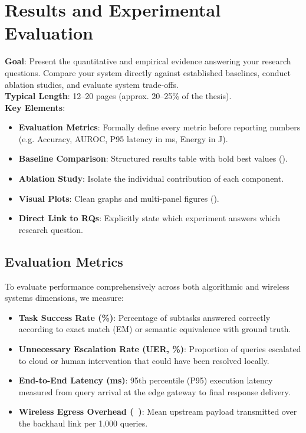 
\chapter{Results and Experimental Evaluation}
\label{ch:evaluation}

\begin{takeawaybox}
\textbf{Goal}: Present the quantitative and empirical evidence answering your research questions. Compare your system directly against established baselines, conduct ablation studies, and evaluate system trade-offs.\\
\textbf{Typical Length}: 12--20 pages (approx. 20--25\% of the thesis).\\
\textbf{Key Elements}:
\begin{itemize}[leftmargin=*]
    \item \textbf{Evaluation Metrics}: Formally define every metric before reporting numbers (e.g. Accuracy, AUROC, P95 latency in \si{\milli\second}, Energy in \si{\joule}).
    \item \textbf{Baseline Comparison}: Structured results table with bold best values ().
    \item \textbf{Ablation Study}: Isolate the individual contribution of each component.
    \item \textbf{Visual Plots}: Clean graphs and multi-panel figures ().
    \item \textbf{Direct Link to RQs}: Explicitly state which experiment answers which research question.
\end{itemize}
\end{takeawaybox}

\section{Evaluation Metrics}
\label{sec:eval_metrics}

To evaluate performance comprehensively across both algorithmic and wireless systems dimensions, we measure:
\begin{itemize}
    \item \textbf{Task Success Rate (\%)}: Percentage of subtasks answered correctly according to exact match (EM) or semantic equivalence with ground truth.
    \item \textbf{Unnecessary Escalation Rate (UER, \%)}: Proportion of queries escalated to cloud or human intervention that could have been resolved locally.
    \item \textbf{End-to-End Latency (\si{\milli\second})}: 95th percentile (P95) execution latency measured from query arrival at the edge gateway to final response delivery.
    \item \textbf{Wireless Egress Overhead (\si{\kibi\byte})}: Mean upstream payload transmitted over the backhaul link per 1,000 queries.
\end{itemize}

